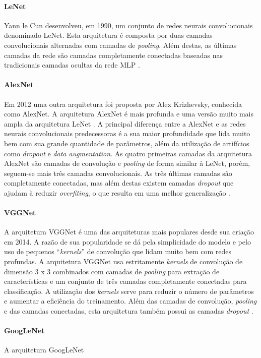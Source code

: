 \paragraph{LeNet} Yann le Cun desenvolveu, em 1990, um conjunto de redes neurais convolucionais denominado LeNet. Esta arquitetura é composta por duas camadas convolucionais alternadas com camadas de \textit{pooling}. Além destas, as últimas camadas da rede são camadas completamente conectadas baseadas nas tradicionais camadas ocultas da rede MLP \cite{ref:gulli}. 

\paragraph{AlexNet} Em 2012 uma outra arquitetura foi proposta por Alex Krizhevsky, conhecida como AlexNet. A arquitetura AlexNet é mais profunda e uma versão muito mais ampla da arquitetura LeNet \cite{ref:satapathy}. A principal diferença entre a AlexNet e as redes neurais convolucionais predecessoras é a sua maior profundidade que lida muito bem com sua grande quantidade de parâmetros, além da utilização de artifícios como \textit{dropout} e \textit{data augmentation}. As quatro primeiras camadas da arquitetura AlexNet são camadas de convolução e \textit{pooling} de forma similar à LeNet, porém, seguem-se mais três camadas convolucionais. As três últimas camadas são completamente conectadas, mas além destas existem camadas \textit{dropout} que ajudam à reduzir \textit{overfiting}, o que resulta em uma melhor generalização \cite{ref:khan}.

\paragraph{VGGNet} A arquitetura VGGNet é uma das arquiteturas mais populares desde sua criação em 2014. A razão de sua popularidade se dá pela simplicidade do modelo e pelo uso de pequenos ``\textit{kernels}'' de convolução que lidam muito bem com redes profundas. A arquitetura VGGNet usa estritamente \textit{kernels} de convolução de dimensão 3 x 3 combinados com camadas de \textit{pooling} para extração de características e um conjunto de três camadas completamente conectadas para classificação. A utilização dos \textit{kernels} serve para reduzir o número de parâmetros e aumentar a eficiência do treinamento. Além das camadas de convolução, \textit{pooling} e das camadas conectadas, esta arquitetura também possui as camadas \textit{dropout} \cite{ref:khan}.

\paragraph{GoogLeNet} A arquitetura GoogLeNet